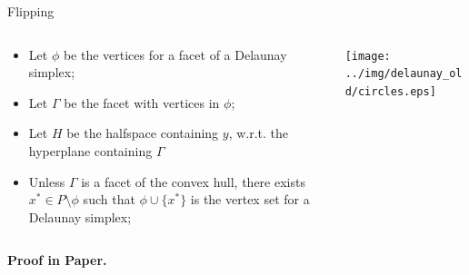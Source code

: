\documentclass[aspectratio=169]{beamer}
\begin{document}
\begin{frame}{Flipping}
\begin{columns}
\begin{column}{.58\textwidth}
\begin{itemize}
\item Let $\phi$ be the vertices for a facet of a Delaunay simplex;
\item Let $\Gamma$ be the facet with vertices in $\phi$;
\item Let $H$ be the halfspace containing $y$,
w.r.t. the hyperplane containing $\Gamma$
\item Unless $\Gamma$ is a facet of the convex hull, there exists
$x^* \in P \setminus \phi$ such that $\phi \cup \{x^*\}$
is the vertex set for a Delaunay simplex;
\end{itemize}
\end{column}
\begin{column}{.4\textwidth}
\texttt{[image: ../img/delaunay\_old/circles.eps]}
\end{column}
\end{columns}
\medskip
\centerline{\bf Proof in Paper.}
\end{frame}
\end{document}
